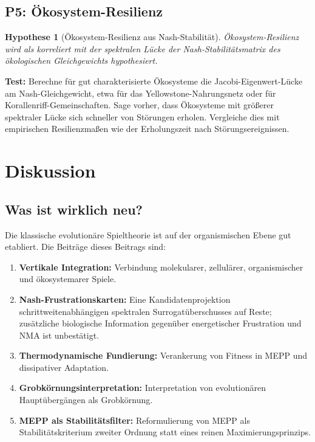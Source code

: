 \documentclass[12pt,a4paper]{article}
\newtheorem{hypothesis}{Hypothese}
\theoremstyle{remark}
\begin{document}
\subsection{P5: Ökosystem-Resilienz}

\begin{hypothesis}[Ökosystem-Resilienz aus Nash-Stabilität]
Ökosystem-Resilienz wird als korreliert mit der spektralen Lücke der Nash-Stabilitätsmatrix des ökologischen Gleichgewichts hypothesiert.
\end{hypothesis}

\textbf{Test:} Berechne für gut charakterisierte Ökosysteme die Jacobi-Eigenwert-Lücke am Nash-Gleichgewicht, etwa für das Yellowstone-Nahrungsnetz oder für Korallenriff-Gemeinschaften. Sage vorher, dass Ökosysteme mit größerer spektraler Lücke sich schneller von Störungen erholen. Vergleiche dies mit empirischen Resilienzmaßen wie der Erholungszeit nach Störungsereignissen.

\section{Diskussion}
\label{sec:discussion}

\subsection{Was ist wirklich neu?}

Die klassische evolutionäre Spieltheorie ist auf der organismischen Ebene gut etabliert. Die Beiträge dieses Beitrags sind:
\begin{enumerate}
    \item \textbf{Vertikale Integration:} Verbindung molekularer, zellulärer, organismischer und ökosystemarer Spiele.
    \item \textbf{Nash-Frustrationskarten:} Eine Kandidatenprojektion schrittweitenabhängigen spektralen Surrogatüberschusses auf Reste; zusätzliche biologische Information gegenüber energetischer Frustration und NMA ist unbestätigt.
    \item \textbf{Thermodynamische Fundierung:} Verankerung von Fitness in MEPP und dissipativer Adaptation.
    \item \textbf{Grobkörnungsinterpretation:} Interpretation von evolutionären Hauptübergängen als Grobkörnung.
    \item \textbf{MEPP als Stabilitätsfilter:} Reformulierung von MEPP als Stabilitätskriterium zweiter Ordnung statt eines reinen Maximierungsprinzips.
\end{enumerate}
\end{document}
